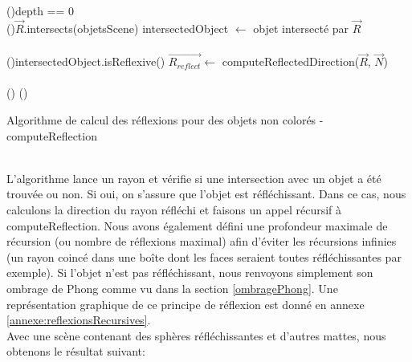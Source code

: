 \documentclass[11pt]{article}
\begin{document}
\begin{algorithm}[H]
	\DontPrintSemicolon

	\If(){depth == 0}
	{
	}
	\hfill\\

	\If(){$\overrightarrow{R}$.intersects(objetsScene)}
	{
		intersectedObject $\gets$ objet intersecté par $\overrightarrow{R}$\\\hfill\\

		\If(){intersectedObject.isReflexive()}
		{
			$\overrightarrow{R_{reflect}} \gets$ computeReflectedDirection($\overrightarrow{R}$, $\overrightarrow{N}$)\\\hfill\\

		}
		\Else()
		{
		}
	}
	\Else()
	{
	}

	\caption{Algorithme de calcul des réflexions pour des objets non colorés - computeReflection}
	\label{algoReflections}
\end{algorithm}
\hfill\\
L'algorithme lance un rayon et vérifie si une intersection avec un objet a été trouvée ou non. Si oui, on s'assure que l'objet est réfléchissant. Dans ce cas, nous calculons la direction du rayon réfléchi et faisons un appel récursif à computeReflection. Nous avons également défini une profondeur maximale de récursion (ou nombre de réflexions maximal) afin d'éviter les récursions infinies (un rayon coincé dans une boîte dont les faces seraient toutes réfléchissantes par exemple). Si l'objet n'est pas réfléchissant, nous renvoyons simplement son ombrage de Phong comme vu dans la section \ref{ombragePhong}. Une représentation graphique de ce principe de réflexion est donné en annexe \ref{annexe:reflexionsRecursives}.\\
Avec une scène contenant des sphères réfléchissantes et d'autres mattes, nous obtenons le résultat suivant: 
\end{document}
